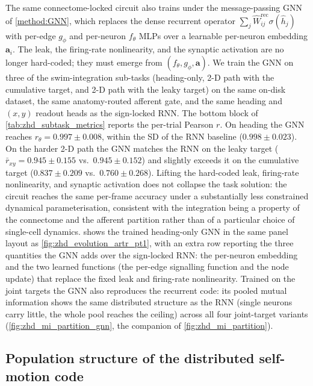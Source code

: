 \documentclass[11pt]{article}
\begin{document}
\label{res:gnn_subtasks}
The same connectome-locked circuit also trains under the message-passing
GNN of \cref{method:GNN}, which replaces the dense recurrent operator
$\sum_j\hat W^{\mathrm{rec}}_{ij}\sigma(\hat h_j)$ with per-edge $g_\phi$
and per-neuron $f_\theta$ MLPs over a learnable per-neuron embedding
$\mathbf a_i$. The leak, the firing-rate nonlinearity, and the synaptic
activation are no longer hard-coded; they must emerge from
$(f_\theta, g_\phi, \mathbf a)$. We train the GNN on three of the
swim-integration sub-tasks (heading-only, 2-D path with the
cumulative target, and 2-D path with the leaky target) on the same
on-disk dataset, the same anatomy-routed afferent gate, and the same
heading and $(x, y)$ readout heads as the sign-locked RNN. The bottom
block of \cref{tab:zhd_subtask_metrics} reports the per-trial Pearson
$r$. On heading the GNN reaches $r_\theta = 0.997 \pm 0.008$, within
the SD of the RNN baseline ($0.998 \pm 0.023$). On the harder 2-D path
the GNN matches the RNN on the leaky target
($\bar r_{xy} = 0.945 \pm 0.155$ vs.\ $0.945 \pm 0.152$) and slightly
exceeds it on the cumulative target
($0.837 \pm 0.209$ vs.\ $0.760 \pm 0.268$). Lifting the hard-coded
leak, firing-rate nonlinearity, and synaptic activation does not
collapse the task solution: the circuit reaches the same
per-frame accuracy under a substantially less constrained dynamical
parameterisation, consistent with the integration being a property of
the connectome and the afferent partition rather than of a particular
choice of single-cell dynamics.
 shows the trained heading-only GNN in the
same panel layout as \cref{fig:zhd_evolution_artr_pt1}, with an extra
row reporting the three quantities the GNN adds over the sign-locked
RNN: the per-neuron embedding and the two learned functions (the
per-edge signalling function and the node update) that replace the
fixed leak and firing-rate nonlinearity. Trained on the joint targets the
GNN also reproduces the recurrent code: its pooled mutual information shows
the same distributed structure as the RNN (single neurons carry little,
the whole pool reaches the ceiling) across all four joint-target
variants (\cref{fig:zhd_mi_partition_gnn}, the companion of
\cref{fig:zhd_mi_partition}).


\subsection{Population structure of the distributed self-motion code}
\label{sec:results_four_classes}
\end{document}
